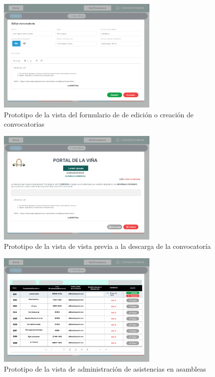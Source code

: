 \begin{figure}[H]
    \centering
    \includegraphics[width=0.7\textwidth]{resources/images/convocatorias_edit}
    \caption{Prototipo de la vista del formulario de de edición o creación de convocatorias}
    \label{fig:convocatorias-edit}
\end{figure}

\begin{figure}[H]
    \centering
    \includegraphics[width=0.7\textwidth]{resources/images/convocatorias_ver}
    \caption{Prototipo de la vista de vista previa a la descarga de la convocatoría}
    \label{fig:convocatorias-ver}
\end{figure}

\begin{figure}[H]
    \centering
    \includegraphics[width=0.7\textwidth]{resources/images/convocatorias_asistentes}
    \caption{Prototipo de la vista de administración de asistencias en asambleas}
    \label{fig:convocatorias-asistentes}
\end{figure}

